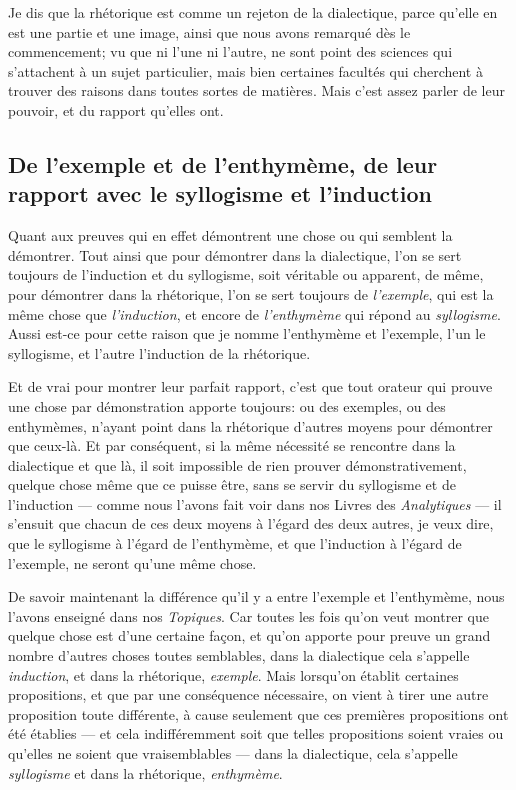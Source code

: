 Je dis que la rhétorique est comme un rejeton de la dialectique, parce qu'elle en est une partie et une image, ainsi que nous avons remarqué dès le
commencement; vu que ni l'une ni l'autre, ne sont point des sciences qui s'attachent à un sujet particulier, mais bien certaines facultés qui cherchent
à trouver des raisons dans toutes sortes de matières. Mais c'est assez parler de leur pouvoir, et du rapport qu'elles ont.

\subsection{De l'exemple et de l'enthymème, de leur rapport avec le syllogisme et l'induction}

Quant aux preuves qui en effet démontrent une chose ou qui semblent la démontrer. Tout ainsi que pour démontrer dans la dialectique, l'on se sert toujours
de l'induction et du syllogisme, soit véritable ou apparent, de même, pour démontrer dans la rhétorique, l'on se sert toujours de \emph{l'exemple}, qui est
la même chose que \emph{l'induction}, et encore de \emph{l'enthymème} qui répond au \emph{syllogisme}. Aussi est-ce pour cette raison que je nomme l'enthymème
et l'exemple, l'un le syllogisme, et l'autre l'induction de la rhétorique.

Et de vrai pour montrer leur parfait rapport, c'est que tout orateur qui prouve une chose par démonstration apporte toujours: ou des exemples, ou des
enthymèmes, n'ayant point dans la rhétorique d'autres moyens pour démontrer que ceux-là. Et par conséquent, si la même nécessité se rencontre dans la
dialectique et que là, il soit impossible de rien prouver démonstrativement, quelque chose même que ce puisse être, sans se servir du syllogisme et de
l'induction --- comme nous l'avons fait voir dans nos Livres des \emph{Analytiques} --- il s'ensuit que chacun de ces deux moyens à l'égard des deux
autres, je veux dire, que le syllogisme à l'égard de l'enthymème, et que l'induction à l'égard de l'exemple, ne seront qu'une même chose.

\bigbreak

De savoir maintenant la différence qu'il y a entre l'exemple et l'enthymème, nous l'avons enseigné dans nos \emph{Topiques}. Car toutes les fois qu'on veut
montrer que quelque chose est d'une certaine façon, et qu'on apporte pour preuve un grand nombre d'autres choses toutes semblables, dans la dialectique cela
s'appelle \emph{induction}, et dans la rhétorique, \emph{exemple}. Mais lorsqu'on établit certaines propositions, et que par une conséquence nécessaire, on
vient à tirer une autre proposition toute différente, à cause seulement que ces premières propositions ont été établies --- et cela indifféremment soit que
telles propositions soient vraies ou qu'elles ne soient que vraisemblables --- dans la dialectique, cela s'appelle \emph{syllogisme} et dans la rhétorique,
\emph{enthymème}.

